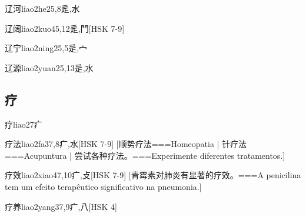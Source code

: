 \begin{EntryWithPhonetic}{辽河}{liao2he2}{5,8}{⾡,⽔}
\end{EntryWithPhonetic}

\begin{EntryWithPhonetic}{辽阔}{liao2kuo4}{5,12}{⾡,⾨}[HSK 7-9]
\end{EntryWithPhonetic}

\begin{EntryWithPhonetic}{辽宁}{liao2ning2}{5,5}{⾡,⼧}
\end{EntryWithPhonetic}

\begin{EntryWithPhonetic}{辽源}{liao2yuan2}{5,13}{⾡,⽔}
\end{EntryWithPhonetic}

\subsection*{疗}

\begin{EntryWithPhonetic}{疗}{liao2}{7}{⽧}
\end{EntryWithPhonetic}

\begin{EntryWithPhonetic}{疗法}{liao2fa3}{7,8}{⽧,⽔}[HSK 7-9]
  [顺势疗法===Homeopatia | 针疗法===Acupuntura | 尝试各种疗法。===Experimente diferentes tratamentos.]
\end{EntryWithPhonetic}

\begin{EntryWithPhonetic}{疗效}{liao2xiao4}{7,10}{⽧,⽁}[HSK 7-9]
  [青霉素对肺炎有显著的疗效。===A penicilina tem um efeito terapêutico significativo na pneumonia.]
\end{EntryWithPhonetic}

\begin{EntryWithPhonetic}{疗养}{liao2yang3}{7,9}{⽧,⼋}[HSK 4]
\end{EntryWithPhonetic}

